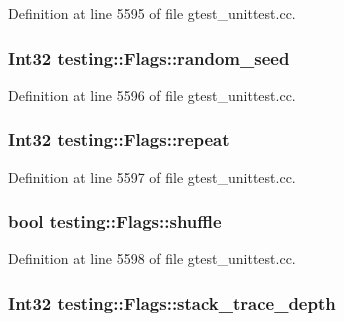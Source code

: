 Definition at line 5595 of file gtest\+\_\+unittest.\+cc.

\subsubsection[{\texorpdfstring{random\+\_\+seed}{random_seed}}]{\setlength{\rightskip}{0pt plus 5cm}Int32 testing\+::\+Flags\+::random\+\_\+seed}\hypertarget{structtesting_1_1_flags_a4728bce63433f711205fd7b427e57f1b}{}\label{structtesting_1_1_flags_a4728bce63433f711205fd7b427e57f1b}


Definition at line 5596 of file gtest\+\_\+unittest.\+cc.

\subsubsection[{\texorpdfstring{repeat}{repeat}}]{\setlength{\rightskip}{0pt plus 5cm}Int32 testing\+::\+Flags\+::repeat}\hypertarget{structtesting_1_1_flags_a61614dd07f97f6e04d27c004ff15195e}{}\label{structtesting_1_1_flags_a61614dd07f97f6e04d27c004ff15195e}


Definition at line 5597 of file gtest\+\_\+unittest.\+cc.

\subsubsection[{\texorpdfstring{shuffle}{shuffle}}]{\setlength{\rightskip}{0pt plus 5cm}bool testing\+::\+Flags\+::shuffle}\hypertarget{structtesting_1_1_flags_a51c689e47e0f55c16116ac2a1d3b05d6}{}\label{structtesting_1_1_flags_a51c689e47e0f55c16116ac2a1d3b05d6}


Definition at line 5598 of file gtest\+\_\+unittest.\+cc.

\subsubsection[{\texorpdfstring{stack\+\_\+trace\+\_\+depth}{stack_trace_depth}}]{\setlength{\rightskip}{0pt plus 5cm}Int32 testing\+::\+Flags\+::stack\+\_\+trace\+\_\+depth}\hypertarget{structtesting_1_1_flags_a20c6592453909c1adace64bf6a2bc2de}{}\label{structtesting_1_1_flags_a20c6592453909c1adace64bf6a2bc2de}



